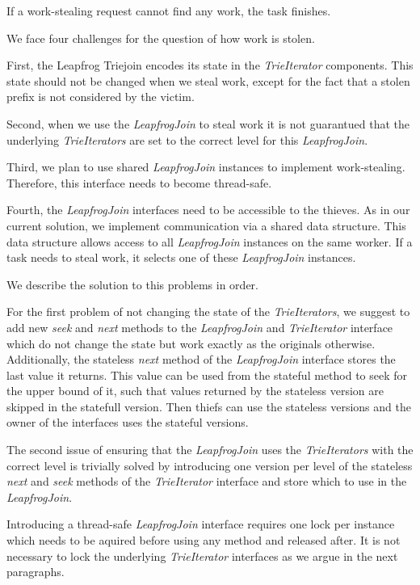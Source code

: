 If a work-stealing request cannot find any work, the task finishes.

We face four challenges for the question of how work is stolen.

First, the Leapfrog Triejoin encodes its state in the \textit{TrieIterator} components.
This state should not be changed when we steal work, except for the fact that a stolen
prefix is not considered by the victim.

Second, when we use the \textit{LeapfrogJoin} to steal work it is not guarantued that the underlying
\textit{TrieIterators} are set to the correct level for this \textit{LeapfrogJoin}.

Third, we plan to use shared \textit{LeapfrogJoin} instances to implement work-stealing.
Therefore, this interface needs to become thread-safe.

Fourth, the \textit{LeapfrogJoin} interfaces need to be accessible to the thieves.
As in our current solution, we implement communication via a shared data structure.
This data structure allows access to all \textit{LeapfrogJoin} instances on the same worker.
If a task needs to steal work, it selects one of these \textit{LeapfrogJoin} instances.

We describe the solution to this problems in order.

For the first problem of not changing the state of the \textit{TrieIterators}, we
suggest to add new \textit{seek} and \textit{next} methods to the \textit{LeapfrogJoin} and
\textit{TrieIterator} interface which do not change the state but work exactly as the originals
otherwise.
Additionally, the stateless \textit{next} method of the \textit{LeapfrogJoin} interface stores
the last value it returns.
This value can be used from the stateful method to seek for the upper bound of it, such that
values returned by the stateless version are skipped in the statefull version.
Then thiefs can use the stateless versions and the owner of the interfaces uses the stateful
versions.

The second issue of ensuring that the \textit{LeapfrogJoin} uses the \textit{TrieIterators} with
the correct level is trivially solved by introducing one version per level of the stateless \textit{next}
and \textit{seek} methods of the \textit{TrieIterator} interface and store which to use in the
\textit{LeapfrogJoin}.

Introducing a thread-safe \textit{LeapfrogJoin} interface requires one lock per instance which
needs to be aquired before using any method and released after.
It is not necessary to lock the underlying \textit{TrieIterator} interfaces as we argue in the next
paragraphs.

